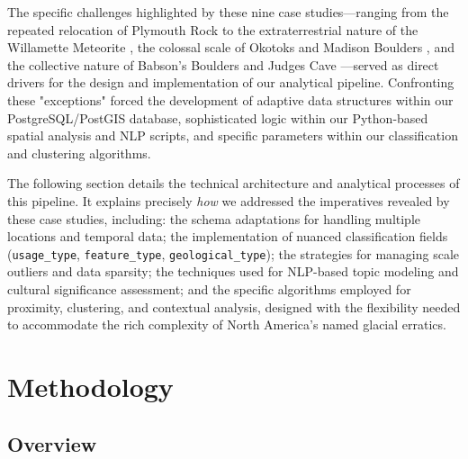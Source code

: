 \documentclass[
11pt, %
english, %
singlespacing, %
headsepline, %
]{MastersDoctoralThesis} %
\begin{document}
The specific challenges highlighted by these nine case studies—ranging from the repeated relocation of Plymouth Rock \cite{Seelye1997} to the extraterrestrial nature of the Willamette Meteorite \cite{AMNHWillamette}, the colossal scale of Okotoks \cite{AlbertaOkotoks} and Madison Boulders \cite{NHMadisonBoulder}, and the collective nature of Babson's Boulders \cite{wburMysteriousBoulders} and Judges Cave \cite{Dana1891}—served as direct drivers for the design and implementation of our analytical pipeline. Confronting these "exceptions" forced the development of adaptive data structures within our PostgreSQL/PostGIS database, sophisticated logic within our Python-based spatial analysis and NLP scripts, and specific parameters within our classification and clustering algorithms.

The following section details the technical architecture and analytical processes of this pipeline. It explains precisely \emph{how} we addressed the imperatives revealed by these case studies, including: the schema adaptations for handling multiple locations and temporal data; the implementation of nuanced classification fields (\texttt{usage\_type}, \texttt{feature\_type}, \texttt{geological\_type}); the strategies for managing scale outliers and data sparsity; the techniques used for NLP-based topic modeling and cultural significance assessment; and the specific algorithms employed for proximity, clustering, and contextual analysis, designed with the flexibility needed to accommodate the rich complexity of North America's named glacial erratics.

\chapter{Methodology}
\label{chapter:method}

\section{Overview}
\label{sec:methodology_overview}
\end{document}
